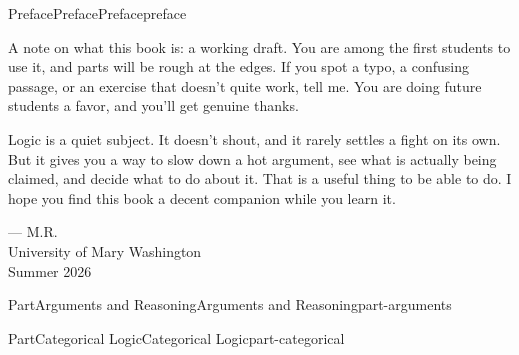 \documentclass[oneside,10pt,]{book}
\begin{document}
\begin{preface}{Preface}{Preface}{}{Preface}{}{}{preface}
\par
A note on what this book is: a working draft. You are among the first students to use it, and parts will be rough at the edges. If you spot a typo, a confusing passage, or an exercise that doesn't quite work, tell me. You are doing future students a favor, and you'll get genuine thanks.%
\par
Logic is a quiet subject. It doesn't shout, and it rarely settles a fight on its own. But it gives you a way to slow down a hot argument, see what is actually being claimed, and decide what to do about it. That is a useful thing to be able to do. I hope you find this book a decent companion while you learn it.%
\par
— M.R.\\
 University of Mary Washington\\
 Summer 2026%
\end{preface}
\setcounter{tocdepth}{0}
\renewcommand*\contentsname{Contents}
\tableofcontents
\mainmatter
%
%
\typeout{************************************************}
\typeout{************************************************}
%
\begin{partptx}{Part}{Arguments and Reasoning}{}{Arguments and Reasoning}{}{}{part-arguments}
\renewcommand*{\partname}{Part}
\end{partptx}
%
%
\typeout{************************************************}
\typeout{************************************************}
%
\begin{partptx}{Part}{Categorical Logic}{}{Categorical Logic}{}{}{part-categorical}
\renewcommand*{\partname}{Part}
\end{partptx}
%
%
\typeout{************************************************}
\typeout{************************************************}
%
\end{document}
